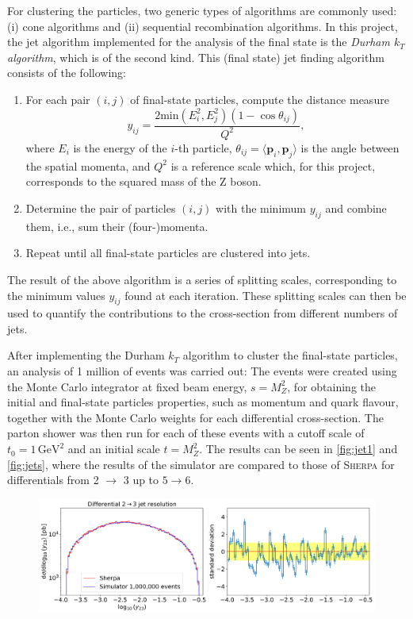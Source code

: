 For clustering the particles, two generic types of algorithms are commonly used: (i) cone algorithms and (ii) sequential recombination algorithms. In this project, the jet algorithm implemented for the analysis of the final state is the \textit{Durham $k_{T}$ algorithm}, which is of the second kind. This (final state) jet finding algorithm consists of the following:
\begin{enumerate}
    \item For each pair $(i, j)$ of final-state particles, compute the distance measure
    \begin{equation}
        y_{i j} = \frac{2 \text{min}(E_{i}^{2}, E_{j}^{2}) (1 - \cos{\theta_{ij}})}{Q^{2}},
    \end{equation}
    where $E_{i}$ is the energy of the $i$-th particle, $\theta_{i j} = \langle \mathbf{p}_{i}, \mathbf{p}_{j} \rangle$ is the angle between the spatial momenta, and $Q^{2}$ is a reference scale which, for this project, corresponds to the squared mass of the Z boson.

    \item Determine the pair of particles $(i, j)$ with the minimum $y_{i j}$ and combine them, i.e., sum their (four-)momenta.

    \item Repeat until all final-state particles are clustered into jets.
\end{enumerate}
The result of the above algorithm is a series of splitting scales, corresponding to the minimum values $y_{i j}$ found at each iteration. These splitting scales can then be used to quantify the contributions to the cross-section from different numbers of jets.

After implementing the Durham $k_{T}$ algorithm to cluster the final-state particles, an analysis of 1 million of events was carried out: The events were created using the Monte Carlo integrator at fixed beam energy, $s = M_{Z}^{2}$, for obtaining the initial and final-state particles properties, such as momentum and quark flavour, together with the Monte Carlo weights for each differential cross-section. The parton shower was then run for each of these events with a cutoff scale of $t_{0} = 1 \,\text{GeV}^{2}$ and an initial scale $t = M_{Z}^{2}$. The results can be seen in \autoref{fig:jet1} and \autoref{fig:jets}, where the results of the simulator are compared to those of \textsc{Sherpa} for differentials from 2 $\to$ 3 up to $5 \to 6$.

\begin{figure}[ht!]
    \centering
    \includegraphics[width=\textwidth]{figures/jet_histo_1.png}
    \caption{}
    \label{fig:jet1}
\end{figure}

